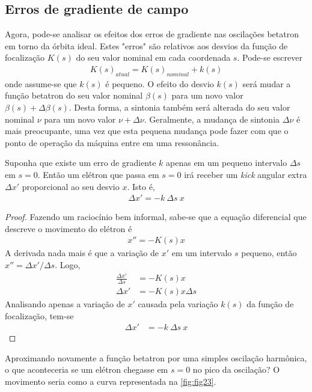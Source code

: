 \subsection{Erros de gradiente de campo}\label{sec:2.11}
Agora, pode-se analisar os efeitos dos erros de gradiente nas oscilações betatron em torno da órbita ideal. Estes "erros" são relativos aos desvios da função de focalização $K(s)$ do seu valor nominal em cada coordenada $s$. Pode-se escrever
\begin{align*}
	K(s)_{atual} = K(s)_{nominal} + k(s)
\end{align*}
onde assume-se que $k(s)$ é pequeno. O efeito do desvio $k(s)$ será mudar a função betatron do seu valor nominal $\beta(s)$ para um novo valor $\beta(s)+\Delta \beta(s)$. Desta forma, a sintonia também será alterada do seu valor nominal $\nu$ para um novo valor $\nu + \Delta \nu$. Geralmente, a mudança de sintonia $\Delta \nu$ é mais preocupante, uma vez que esta pequena mudança pode fazer com que o ponto de operação da máquina entre em uma ressonância.

Suponha que existe um erro de gradiente $k$ apenas em um pequeno intervalo $\Delta s$ em $s=0$. Então um elétron que passa em $s=0$ irá receber um \textit{kick} angular extra $\Delta x'$ proporcional ao seu desvio $x$. Isto é,
\begin{align}
	\Delta x' = -k\ \Delta s\ x\label{eq:2.96}
\end{align}

\begin{proof}
	Fazendo um raciocínio bem informal, sabe-se que a equação diferencial que descreve o movimento do elétron é
	\begin{align*}
		x'' = -K(s)x
	\end{align*}
	A derivada nada mais é que a variação de $x'$ em um intervalo $s$ pequeno, então $x'' = \Delta x'/\Delta s$. Logo,
	\begin{align*}
		\frac{\Delta x'}{\Delta s} &= -K(s)x\\
		\Delta x' &= -K(s)x \Delta s
	\end{align*}
	Analisando apenas a variação de $x'$ causada pela variação $k(s)$ da função de focalização, tem-se
	\begin{align*}
		\Delta x' &= -k\ \Delta s\ x
	\end{align*}
\end{proof}

Aproximando novamente a função betatron por uma simples oscilação harmônica, o que aconteceria se um elétron chegasse em $s=0$ no pico da oscilação? O movimento seria como a curva representada na \autoref{fig:fig23}.

